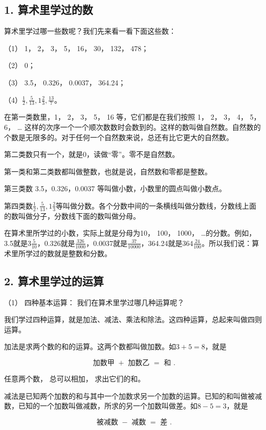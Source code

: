 \subsection{1. 算术里学过的数}

算术里学过哪一些数呢？我们先来看一看下面这些数：

（1） 1， 2， 3， 5， 16， 30， 132， 478；

（2） 0；

（3） 3.5， 0.326， 0.0037， 364.24；

（4）\(\frac{1}{2}, \frac{5}{13}, 1\frac{2}{3}, \frac{13}{7}\)。

在第一类数里，1， 2， 3， 5， 16 等，它们都是在我们按照 1， 2， 3， 4，
5， 6， \ldots{}
这样的次序一个一个顺次数数时会数到的。这样的数叫做自然数。自然数的个数是无限多的。对于任何一个自然数来说，总还有比它更大的自然数。

第二类数只有一个，就是0，读做``零''。零不是自然数。

第一类和第二类数都叫做整数，也就是说，自然数和零都是整数。

第三类数 3.5，0.326，0.0037 等叫做小数，小数里的圆点叫做小数点。

第四类数\(\frac{1}{2}, \frac{5}{13}, 1\frac{2}{3}\)等叫做分数。各个分数中间的一条横线叫做分数线，分数线上面的数叫做分子，分数线下面的数叫做分母。

在算术里所学过的小数，实际上就是分母为10， 100， 1000，
\ldots 的分数。例如，3.5就是\(3\frac{5}{10}\)，0.326就是\(\frac{326}{1000}\)，0.0037就是\(\frac{37}{10000}\)，364.24就是\(364\frac{24}{100}\)。所以我们说：算术里所学过的数就是整数和分数。

\subsection{2. 算术里学过的运算}

（1） 四种基本运算： 我们在算术里学过哪几种运算呢？

我们学过四种运算，就是加法、减法、乘法和除法。这四种运算，总起来叫做四则运算。

加法是求两个数的和的运算。这两个数都叫做加数。如\(3 + 5 = 8\)，就是

\[
\text{ 加数甲 } + \text{ 加数乙 } = \text{ 和 }.
\]

任意两个数， 总可以相加， 求出它们的和。

减法是已知两个加数的和与其中一个加数求另一个加数的运算。已知的和叫做被减数，已知的一个加数叫做减数，所求的另一个加数叫做差。如\(8 - 5 = 3\)，就是

\[
\text{ 被减数 } - \text{ 减数 } = \text{ 差 }.
\]

